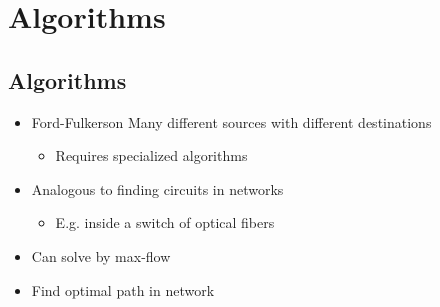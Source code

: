 
\section{Algorithms}

\subsection{Algorithms}
\begin{itemize}
        \begin{itemize}
             How much traffic can a network carry
             How reliable is a network
            \item Ford-Fulkerson
             Many different sources with different destinations
                \begin{itemize}
                    \item Requires specialized algorithms
                \end{itemize}
        \end{itemize}
        \begin{itemize}
            \item Analogous to finding circuits in networks
                \begin{itemize}
                    \item E.g. inside a switch of optical fibers
                \end{itemize}
            \item Can solve by max-flow
        \end{itemize}
        \begin{itemize}
            \item Find optimal path in network
        \end{itemize}
\end{itemize}

